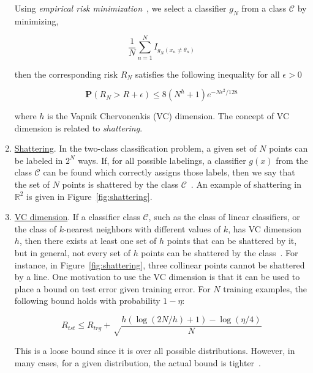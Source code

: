 \begin{enumerate}
Using \emph{empirical risk minimization}~\cite{1999_BOOK_PRML_Vapnik}, we select a classifier $g_N$ from a class $\mathcal{C}$ by minimizing, 

\begin{equation}
\frac{1}{N} \sum\limits_{n=1}^N I_{g_N(x_n \neq \theta_n)}
\end{equation}

then the corresponding risk $R_N$ satisfies the following inequality for all $\epsilon > 0$

\begin{equation}
\mathbf{P}(R_N > R + \epsilon) \leq 8(N^h + 1) e^{-N\epsilon^2/128}
\end{equation}

where $h$ is the Vapnik Chervonenkis (VC) dimension.  The concept of VC dimension is related to \emph{shattering}.

\item \underline{Shattering}.  In the two-class classification problem, a given set of $N$ points can be labeled in $2^N$ ways.  If, for all possible labelings, a classifier $g(x)$ from the class $\mathcal{C}$ can be found which correctly assigns those labels, then we say that the set of $N$ points is shattered by the class $\mathcal{C}$~\cite{1998_JNL_SVM_Burges}.  An example of shattering in $\mathbb{R}^2$ is given in Figure~\ref{fig:shattering}.

\item \underline{VC dimension}.  If a classifier class $\mathcal{C}$, such as the class of linear classifiers, or the class of $k$-nearest neighbors with different values of $k$, has VC dimension $h$, then there exists at least one set of $h$ points that can be shattered by it, but in general, not every set of $h$ points can be shattered by the class~\cite{1998_JNL_SVM_Burges}.  For instance, in Figure~\ref{fig:shattering}, three collinear points cannot be shattered by a line.  One motivation to use the VC dimension is that it can be used to place a bound on test error given training error.  For $N$ training examples, the following bound holds with probability $1-\eta$\cite{1999_BOOK_PRML_Vapnik}:

\begin{equation}
R_{tst} \leq R_{trg} + \sqrt\frac{h(\log (2N/h)+1) - \log (\eta/4)}{N}
\end{equation}

This is a loose bound since it is over all possible distributions.  However, in many cases, for a given distribution, the actual bound is tighter~\cite{Videolectures.net}.


\end{enumerate}
